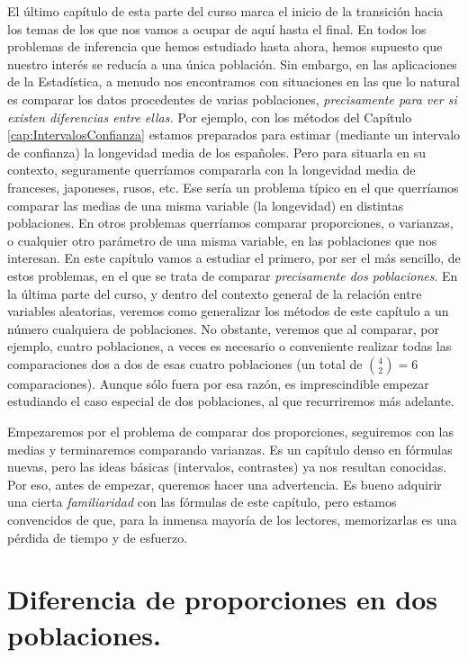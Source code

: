 
El último capítulo de esta parte del curso marca el inicio de la transición hacia los temas de los
que nos vamos a ocupar de aquí hasta el final. En todos los problemas de inferencia que hemos
estudiado hasta ahora, hemos supuesto que nuestro interés se reducía a una única población. Sin
embargo, en las aplicaciones de la Estadística, a menudo nos encontramos con situaciones en las que
lo natural es comparar los datos procedentes de varias poblaciones, {\em precisamente para ver si
existen diferencias entre ellas.} Por ejemplo, con los métodos del Capítulo
\ref{cap:IntervalosConfianza} estamos preparados para estimar (mediante un intervalo de confianza)
la longevidad media de los españoles. Pero para situarla en su contexto, seguramente querríamos
compararla con la longevidad media de franceses, japoneses, rusos, etc. Ese sería un problema
típico en el que querríamos comparar las medias de una misma variable (la longevidad) en distintas
poblaciones. En otros problemas querríamos comparar proporciones, o varianzas, o cualquier otro
parámetro de una misma variable, en las poblaciones que nos interesan. En este capítulo vamos a
estudiar el primero, por ser el más sencillo, de estos problemas, en el que se trata de comparar
{\em precisamente dos poblaciones}. En la última parte del curso, y dentro del contexto general de
la relación entre variables aleatorias, veremos como generalizar los métodos de este capítulo a un
número cualquiera de poblaciones. No obstante, veremos que al comparar, por ejemplo, cuatro
poblaciones, a veces es necesario o conveniente realizar todas las comparaciones dos a dos de esas
cuatro poblaciones (un total de $\binom{4}{2}=6$ comparaciones). Aunque sólo fuera por esa razón,
es imprescindible empezar estudiando el caso especial de dos poblaciones, al que recurriremos más
adelante.

Empezaremos por el problema de comparar dos proporciones, seguiremos con las medias y terminaremos
comparando varianzas. Es un capítulo denso en fórmulas nuevas, pero las ideas básicas (intervalos,
contrastes) ya nos resultan conocidas. Por eso, antes de empezar, queremos hacer una advertencia.
Es bueno adquirir una cierta {\em familiaridad} con las fórmulas de este capítulo, pero estamos
convencidos de que, para la inmensa mayoría de los lectores, memorizarlas es una pérdida de tiempo
y de esfuerzo.

\section{Diferencia de proporciones en dos poblaciones.}
\label{cap09:sec:DiferenciaProporciones2Poblaciones}

